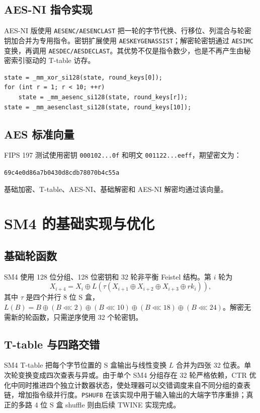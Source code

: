 \documentclass[a4paper,12pt]{ctexart}
\begin{document}
\subsection{AES-NI 指令实现}

AES-NI 版使用 \texttt{AESENC/AESENCLAST} 把一轮的字节代换、行移位、列混合与轮密钥加合并为专用指令。密钥扩展使用 \texttt{AESKEYGENASSIST}；解密轮密钥通过 \texttt{AESIMC} 变换，再调用 \texttt{AESDEC/AESDECLAST}。其优势不仅是指令数少，也是不再产生由秘密索引驱动的 T-table 访存。

\begin{lstlisting}
state = _mm_xor_si128(state, round_keys[0]);
for (int r = 1; r < 10; ++r)
    state = _mm_aesenc_si128(state, round_keys[r]);
state = _mm_aesenclast_si128(state, round_keys[10]);
\end{lstlisting}

\subsection{AES 标准向量}

FIPS 197 测试使用密钥 \texttt{000102...0f} 和明文 \texttt{001122...eeff}，期望密文为：
\begin{center}
\texttt{69c4e0d86a7b0430d8cdb78070b4c55a}
\end{center}
基础加密、T-table、AES-NI、基础解密和 AES-NI 解密均通过该向量。

\section{SM4 的基础实现与优化}

\subsection{基础轮函数}

SM4 使用 128 位分组、128 位密钥和 32 轮非平衡 Feistel 结构。第 $i$ 轮为
\[
X_{i+4}=X_i\oplus L\!\left(\tau(X_{i+1}\oplus X_{i+2}\oplus X_{i+3}\oplus rk_i)\right),
\]
其中 $\tau$ 是四个并行 8 位 S 盒，$L(B)=B\oplus(B\lll2)\oplus(B\lll10)\oplus(B\lll18)\oplus(B\lll24)$。解密无需新的轮函数，只需逆序使用 32 个轮密钥。

\subsection{T-table 与四路交错}

SM4 T-table 把每个字节位置的 S 盒输出与线性变换 $L$ 合并为四张 32 位表。单次轮变换变成四次查表与异或。由于单个 SM4 分组存在 32 轮严格依赖，CTR 优化中同时推进四个独立计数器状态，使处理器可以交错调度来自不同分组的查表链，增加指令级并行度。\texttt{PSHUFB} 在该实现中用于输入输出的大端字节序重排；真正的多路 4 位 S 盒 shuffle 则由后续 TWINE 实现完成。
\end{document}
